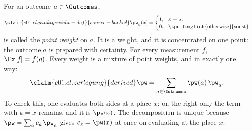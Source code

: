 For an outcome $a \in \Outcomes$,
\begin{equation}\label{c01.eq.punktgewicht}\claim{c01.cl.punktgewicht-def}{source-backed}
  \pw_a(x) =
  \begin{cases}
    1, & x = a, \\
    0, & \text{\tpcifenglish{otherwise}{sonst}}
  \end{cases}
\end{equation}
is called the \emph{point weight} on $a$. It is a weight, and it is concentrated on one
point: the outcome $a$ is prepared with certainty. For every measurement $f$,
$\Ex[f] = f(a)$. Every weight is a mixture of point weights, and in exactly one way:
\begin{equation}\label{c01.eq.zerlegung}\claim{c01.cl.zerlegung}{derived}
  \pw = \sum_{a \in \Outcomes} \pw(a)\, \pw_a .
\end{equation}
To check this, one evaluates both sides at a place $x$: on the right only the term with
$a = x$ remains, and it is $\pw(x)$. The decomposition is unique because
$\pw = \sum_a c_a\, \pw_a$ gives $c_x = \pw(x)$ at once on evaluating at the place $x$.

